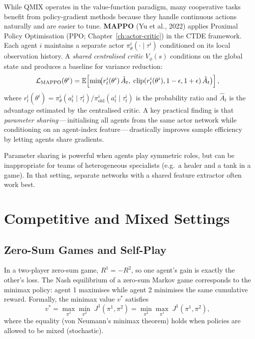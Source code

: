 While QMIX operates in the value-function paradigm, many cooperative
tasks benefit from policy-gradient methods because they handle
continuous actions naturally and are easier to tune. \textbf{MAPPO}
 (Yu et al., 2022) applies Proximal Policy
Optimisation (PPO; Chapter~\ref{ch:actor-critic}) in the CTDE framework.
Each agent $i$ maintains a separate actor $\pi^i_\theta(\cdot \mid
\tau^i)$ conditioned on its local observation history. A \emph{shared
centralised critic} $V_\phi(s)$ conditions on the global state and
produces a baseline for variance reduction:
\begin{equation}
\label{eq:mappo-objective}
\mathcal{L}_\mathrm{MAPPO}(\theta^i) =
\operatorname{\mathbb{E}}\!\left[\min\!\bigl(r^i_t(\theta^i)\,\hat{A}_t,\;
  \mathrm{clip}(r^i_t(\theta^i), 1-\epsilon, 1+\epsilon)\,\hat{A}_t
\bigr)\right],
\end{equation}
where $r^i_t(\theta^i) = \pi^i_\theta(a^i_t \mid \tau^i_t) /
\pi^i_{\mathrm{old}}(a^i_t \mid \tau^i_t)$ is the probability ratio
and $\hat{A}_t$ is the advantage estimated by the centralised critic.
A key practical finding is that \emph{parameter sharing}\,---\,initialising all agents from the same actor network
while conditioning on an agent-index feature\,---\,drastically
improves sample efficiency by letting agents share gradients.

\begin{remark}
Parameter sharing is powerful when agents play symmetric roles, but
can be inappropriate for teams of heterogeneous specialists (e.g.\ a
healer and a tank in a game). In that setting, separate networks with
a shared feature extractor often work best.
\end{remark}

\section{Competitive and Mixed Settings}
\label{sec:competitive}

\subsection{Zero-Sum Games and Self-Play}

In a two-player zero-sum game, $R^1 = -R^2$, so one agent's gain is
exactly the other's loss. The Nash equilibrium of a zero-sum Markov
game corresponds to the minimax policy: agent 1 maximises while agent
2 minimises the same cumulative reward. Formally, the minimax value
$v^*$ satisfies
\[
  v^* = \max_{\pi^1} \min_{\pi^2}\; J^1(\pi^1, \pi^2)
       = \min_{\pi^2} \max_{\pi^1}\; J^1(\pi^1, \pi^2),
\]
where the equality (von Neumann's minimax theorem)
holds when policies are allowed to be mixed (stochastic).

